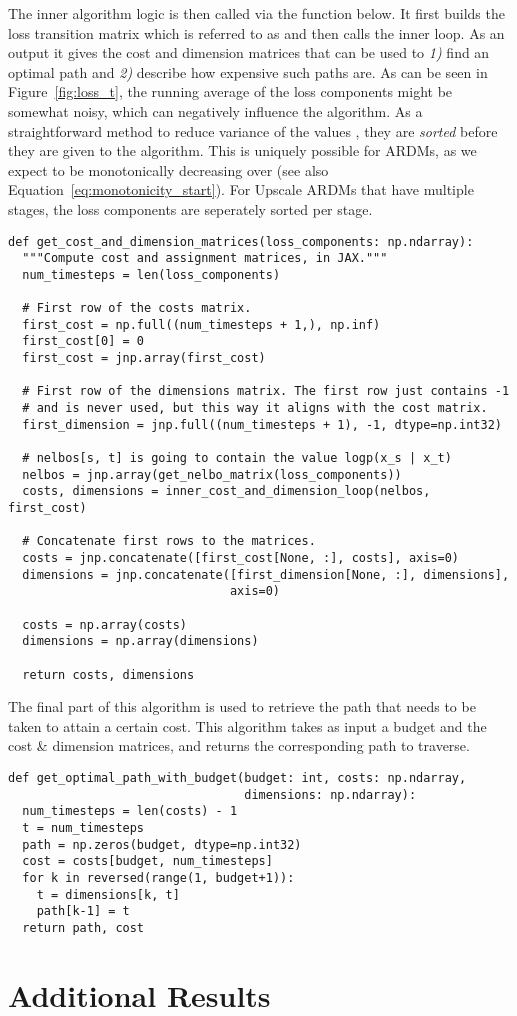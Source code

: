 \documentclass{article} \usepackage{iclr2022_conference,times}
\begin{document}
The inner algorithm logic is then called via the function below. It first builds the loss transition matrix  which is referred to as  and then calls the inner loop. As an output it gives the cost and dimension matrices that can be used to \textit{1)} find an optimal path and \textit{2)} describe how expensive such paths are. As can be seen in Figure~\ref{fig:loss_t}, the running average of the loss components  might be somewhat noisy, which can negatively influence the algorithm. As a straightforward method to reduce variance of the values , they are \textit{sorted} before they are given to the algorithm. This is uniquely possible for ARDMs, as we expect  to be monotonically decreasing over  (see also Equation~\ref{eq:monotonicity_start}). For Upscale ARDMs that have multiple stages, the loss components are seperately sorted per stage.
\begin{lstlisting}
def get_cost_and_dimension_matrices(loss_components: np.ndarray):
  """Compute cost and assignment matrices, in JAX."""
  num_timesteps = len(loss_components)

  # First row of the costs matrix.
  first_cost = np.full((num_timesteps + 1,), np.inf)
  first_cost[0] = 0
  first_cost = jnp.array(first_cost)

  # First row of the dimensions matrix. The first row just contains -1 
  # and is never used, but this way it aligns with the cost matrix.
  first_dimension = jnp.full((num_timesteps + 1), -1, dtype=np.int32)

  # nelbos[s, t] is going to contain the value logp(x_s | x_t)
  nelbos = jnp.array(get_nelbo_matrix(loss_components))
  costs, dimensions = inner_cost_and_dimension_loop(nelbos, first_cost)

  # Concatenate first rows to the matrices.
  costs = jnp.concatenate([first_cost[None, :], costs], axis=0)
  dimensions = jnp.concatenate([first_dimension[None, :], dimensions],
                               axis=0)

  costs = np.array(costs)
  dimensions = np.array(dimensions)

  return costs, dimensions
\end{lstlisting}

The final part of this algorithm is used to retrieve the path that needs to be taken to attain a certain cost. This algorithm takes as input a budget and the cost \& dimension matrices, and returns the corresponding path to traverse.
\begin{lstlisting}
def get_optimal_path_with_budget(budget: int, costs: np.ndarray,
                                 dimensions: np.ndarray):
  num_timesteps = len(costs) - 1
  t = num_timesteps
  path = np.zeros(budget, dtype=np.int32)
  cost = costs[budget, num_timesteps]
  for k in reversed(range(1, budget+1)):
    t = dimensions[k, t]
    path[k-1] = t
  return path, cost
\end{lstlisting} 
\newpage \section{Additional Results}
\end{document}
